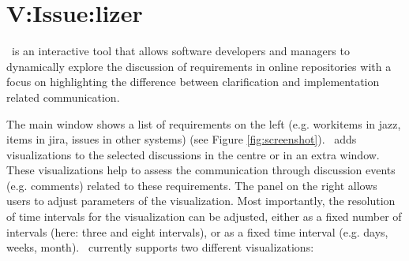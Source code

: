 \section{V:Issue:lizer}


\viss\ is an interactive tool that allows software developers and managers to dynamically explore the discussion of requirements  in online repositories with a focus on highlighting the difference between clarification and implementation related communication.


The main window shows a list of requirements on the  left (e.g. workitems in jazz, items in jira, issues in other systems) (see Figure \ref{fig:screenshot}).
\viss\ adds visualizations to the selected discussions in the centre or in an extra window. 
These visualizations help to assess the communication through discussion events (e.g. comments) related to these requirements.
The panel on the right allows users to adjust parameters of the visualization.
Most importantly, the resolution of time intervals for the visualization can be adjusted, either as a fixed number of intervals (here: three and eight intervals), or as a fixed time interval (e.g. days, weeks, month).
%
\viss\ currently supports two different visualizations: 

